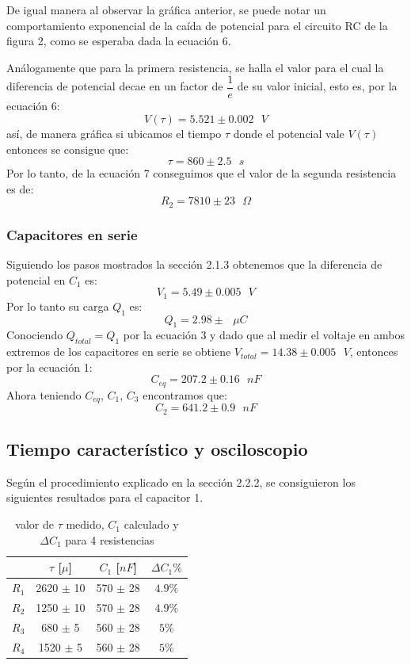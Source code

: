 \documentclass[10pt,letter]{article}
\begin{document}
\begin{multicols}{2}

De igual manera al observar la gráfica anterior, se puede notar un comportamiento exponencial de la caída de potencial para el circuito RC de la figura 2, como se esperaba dada la ecuación 6.

Análogamente que para la primera resistencia, se halla el valor para el cual la diferencia de potencial decae en un factor de $\dfrac{1}{e}$ de su valor inicial, esto es, por la ecuación 6:
$$V(\tau)=5.521 \pm0.002 \text{ } V$$
así, de manera gráfica si ubicamos el tiempo $\tau$ donde el potencial vale $V(\tau)$ entonces se consigue que:
$$\tau=860\pm2.5\text{ }s$$
Por lo tanto, de la ecuación 7 conseguimos que el valor de la segunda resistencia es de:
$$R_2=7810\pm23 \text{ }\Omega$$

\subsubsection{Capacitores en serie}
Siguiendo los pasos mostrados la sección 2.1.3 obtenemos que la diferencia de potencial en $C_1$ es:
$$V_1=5.49\pm 0.005\text{ }V$$
Por lo tanto su carga $Q_1$ es:
$$Q_1=2.98\pm\text{ }\mu C$$
Conociendo $Q_{total}=Q_1$ por la ecuación 3 y dado que al medir el voltaje en ambos extremos de los capacitores en serie se obtiene $V_{total}=14.38\pm0.005\text{ }V$, entonces por la ecuación 1:
$$C_{eq}=207.2\pm0.16\text{ }nF$$
Ahora teniendo $C_{eq}$, $C_1$, $C_3$ encontramos que:
$$C_2=641.2\pm0.9\text{ }nF$$

\subsection{Tiempo característico y osciloscopio}
Según el procedimiento explicado en la sección 2.2.2, se consiguieron los siguientes resultados para el capacitor 1.


\begin{table}[H]
\centering
\begin{tabular}{|c|c|c|c|}
\hline
 & $\tau$ [$\mu$] & $C_1$ [$nF$] & $\Delta C_1 \%$ \\ \hline
$R_1$ & 2620 $\pm$ 10 & 570 $\pm$ 28 & $4.9\%$ \\ \hline
$R_2$ & 1250 $\pm$ 10 & 570 $\pm$ 28 & $4.9\%$ \\ \hline
$R_3$ & 680 $\pm$ 5 & 560 $\pm$ 28 & $5\%$ \\ \hline
$R_4$ & 1520 $\pm$ 5 & 560 $\pm$ 28 & $5\%$ \\ \hline
\end{tabular}
\caption{valor de $\tau$ medido, $C_1$ calculado y $\Delta C_1$ para 4 resistencias }
\end{table}


\end{multicols}
\end{document}
